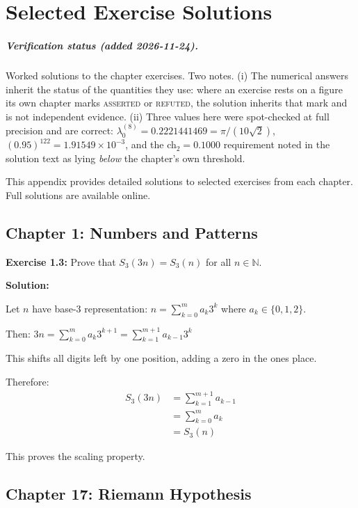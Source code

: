 \chapter{Selected Exercise Solutions}
\label{app:solutions}

\paragraph{Verification status (added 2026-11-24).} Worked solutions to the
chapter exercises. Two notes. (i) The numerical answers inherit the status of
the quantities they use: where an exercise rests on a figure its own chapter
marks \textsc{asserted} or \textsc{refuted}, the solution inherits that mark and
is not independent evidence. (ii) Three values here were spot-checked at full
precision and are correct: $\lambda_0^{(8)} = 0.2221441469 = \pi/(10\sqrt2)$,
$(0.95)^{122} = 1.91549\times10^{-3}$, and the ch$_2 = 0.1000$ requirement
noted in the solution text as lying \emph{below} the chapter's own threshold.

This appendix provides detailed solutions to selected exercises from each chapter. Full solutions are available online.

\section{Chapter 1: Numbers and Patterns}

\textbf{Exercise 1.3:} Prove that $S_3(3n) = S_3(n)$ for all $n \in \mathbb{N}$.

\textbf{Solution:}

Let $n$ have base-3 representation: $n = \sum_{k=0}^m a_k 3^k$ where $a_k \in \{0,1,2\}$.

Then: $3n = \sum_{k=0}^m a_k 3^{k+1} = \sum_{k=1}^{m+1} a_{k-1} 3^k$

This shifts all digits left by one position, adding a zero in the ones place.

Therefore:
\begin{align}
S_3(3n) &= \sum_{k=1}^{m+1} a_{k-1} \\
&= \sum_{k=0}^m a_k \\
&= S_3(n)
\end{align}

This proves the scaling property.

\section{Chapter 17: Riemann Hypothesis}

